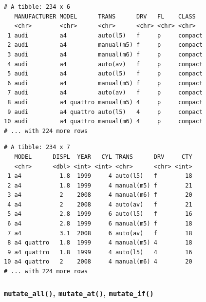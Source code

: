 \documentclass[
  11pt,
]{krantz}
\newenvironment{Shaded}{\begin{snugshade}}{\end{snugshade}}
\newcommand{\CommentTok}[1]{\textcolor[rgb]{0.37,0.37,0.37}{\textit{#1}}}
\newcommand{\KeywordTok}[1]{\textcolor[rgb]{0.27,0.27,0.27}{\textbf{#1}}}
\newcommand{\NormalTok}[1]{#1}
\newcommand{\OperatorTok}[1]{\textcolor[rgb]{0.43,0.43,0.43}{\textbf{#1}}}
\newcommand{\StringTok}[1]{\textcolor[rgb]{0.5,0.5,0.5}{#1}}
\begin{document}
\begin{verbatim}
# A tibble: 234 x 6
   MANUFACTURER MODEL      TRANS      DRV   FL    CLASS  
   <chr>        <chr>      <chr>      <chr> <chr> <chr>  
 1 audi         a4         auto(l5)   f     p     compact
 2 audi         a4         manual(m5) f     p     compact
 3 audi         a4         manual(m6) f     p     compact
 4 audi         a4         auto(av)   f     p     compact
 5 audi         a4         auto(l5)   f     p     compact
 6 audi         a4         manual(m5) f     p     compact
 7 audi         a4         auto(av)   f     p     compact
 8 audi         a4 quattro manual(m5) 4     p     compact
 9 audi         a4 quattro auto(l5)   4     p     compact
10 audi         a4 quattro manual(m6) 4     p     compact
# ... with 224 more rows
\end{verbatim}

\begin{Shaded}
\end{Shaded}

\begin{verbatim}
# A tibble: 234 x 7
   MODEL      DISPL  YEAR   CYL TRANS      DRV     CTY
   <chr>      <dbl> <int> <int> <chr>      <chr> <int>
 1 a4           1.8  1999     4 auto(l5)   f        18
 2 a4           1.8  1999     4 manual(m5) f        21
 3 a4           2    2008     4 manual(m6) f        20
 4 a4           2    2008     4 auto(av)   f        21
 5 a4           2.8  1999     6 auto(l5)   f        16
 6 a4           2.8  1999     6 manual(m5) f        18
 7 a4           3.1  2008     6 auto(av)   f        18
 8 a4 quattro   1.8  1999     4 manual(m5) 4        18
 9 a4 quattro   1.8  1999     4 auto(l5)   4        16
10 a4 quattro   2    2008     4 manual(m6) 4        20
# ... with 224 more rows
\end{verbatim}

\normalsize

\hypertarget{mutate-variant}{%
\subsubsection*{\texorpdfstring{\texttt{mutate\_all()}, \texttt{mutate\_at()}, \texttt{mutate\_if()}}{mutate\_all(), mutate\_at(), mutate\_if()}}\label{mutate-variant}}
\end{document}
